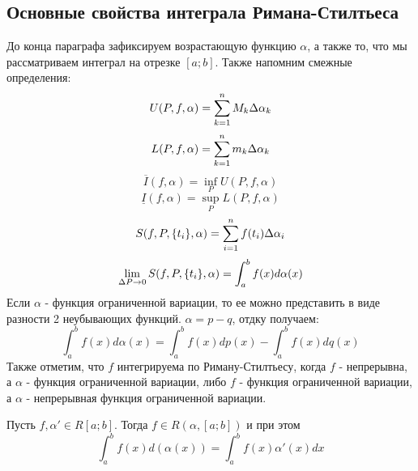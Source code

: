 \subsection{Основные свойства интеграла Римана-Стилтьеса}

\begin{note}
	До конца параграфа зафиксируем возрастающую функцию $\alpha$, а также то, что мы рассматриваем интеграл на отрезке $[a; b]$.
	Также напомним смежные определения:
	\[
		U(P, f, \alpha) = \sum\limits_{k = 1}^nM_k\Delta \alpha_k
	\]
	\[
		L(P, f, \alpha) = \sum\limits_{k = 1}^nm_k\Delta \alpha_k
	\]
	\[
		\overline{I}(f, \alpha) = \inf_P U(P, f, \alpha)
	\]
	\[
		\underline{I}(f, \alpha) = \sup_P L(P, f, \alpha)
	\]
	\[
		S(f, P, \{t_i\}, \alpha) = \sum\limits_{i= 1}^nf(t_i)\Delta\alpha_i
	\]
	\[
		\lim\limits_{\Delta P \to 0}S(f, P, \{t_i\}, \alpha) = \int_a^bf(x)d\alpha(x)
	\]
	Если $\alpha$ - функция ограниченной вариации, то ее можно представить в виде разности 2 неубывающих функций. $\alpha = p - q$, отдку получаем:
	\[
		\int_a^bf(x)d\alpha(x) = \int_a^bf(x)dp(x) - \int_a^bf(x)dq(x)
	\]
	Также отметим, что $f$ интегрируема по Риману-Стилтьесу, когда $f$ - непрерывна, а $\alpha$ - функция ограниченной вариации, либо $f$ - функция ограниченной вариации, а $\alpha$ - непрерывная функция ограниченной вариации. 
\end{note}

\begin{theorem}
	Пусть $f, \alpha' \in R[a; b]$. Тогда $f \in R(\alpha, [a; b])$ и при этом
	\[
		\int_a^b f(x) d(\alpha(x)) = \int_a^b f(x) \alpha'(x) dx
	\]
\end{theorem}

